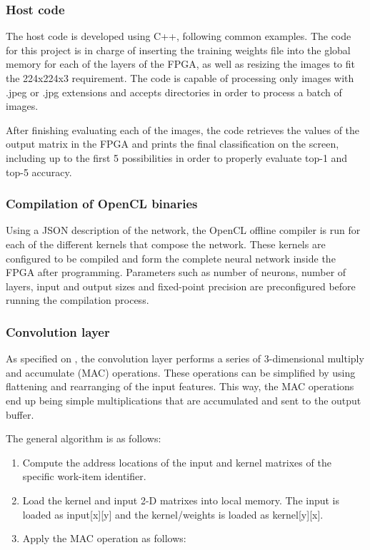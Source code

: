 \begin{enumerate}
\subsubsection{Host code}

The host code is developed using C++, following common \intelOCL examples. The code for this
project is in charge of inserting the training weights file into the global memory
for each of the layers of the
FPGA, as well as resizing the images to fit the 224{x}224{x}3 requirement. The code is capable
of processing only images with .jpeg or .jpg extensions and accepts directories in order to
process a batch of images.

After finishing evaluating each of the images, the code retrieves the values of the output 
matrix in the FPGA and prints the final classification on the screen, including up to the first 
5 possibilities in order to properly evaluate top-1 and top-5 accuracy.

\subsubsection{Compilation of OpenCL binaries}

Using a JSON description of the network, the OpenCL offline compiler is run for each of
the different kernels that compose the network. These kernels are configured to be compiled
and form the complete neural network inside the FPGA after programming. Parameters such as
number of neurons, number of layers, input and output sizes and fixed-point precision are
preconfigured before running the compilation process.

\subsubsection{Convolution layer}

As specified on \cite{suda}, the convolution layer performs a series of 3-dimensional multiply and accumulate (MAC)
operations. These operations can be simplified by using flattening and rearranging of the input features. This way,
the MAC operations end up being simple multiplications that are accumulated and sent to the output buffer.

The general algorithm is as follows:
\begin{enumerate}
    \item Compute the address locations of the input and kernel matrixes
    of the specific work-item identifier.
    \item Load the kernel and input 2-D matrixes into local memory. The input is loaded
    as input[x][y] and the kernel/weights is loaded as kernel[y][x].
    \item Apply the MAC operation as follows: 
    

\end{enumerate}
\end{enumerate}
